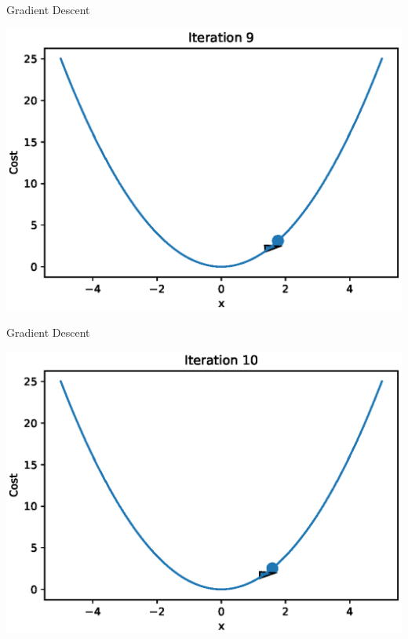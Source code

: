 \documentclass{beamer}
\begin{document}
\begin{frame}{Gradient Descent}
  \begin{center}
       \includegraphics[totalheight=6cm]{gradient-descent/iteration-9.eps}
   \end{center}
\end{frame}

\begin{frame}{Gradient Descent}
  \begin{center}
       \includegraphics[totalheight=6cm]{gradient-descent/iteration-10.eps}
   \end{center}
\end{frame}
\end{document}
